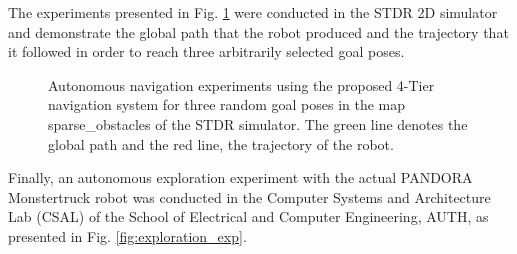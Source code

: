 \documentclass[conference]{IEEEtran}
\begin{document}
The experiments presented in Fig. \ref{fig:rsband_exp} were conducted in the STDR 2D simulator and demonstrate the global path that the robot produced and the trajectory that it followed in order to reach three arbitrarily selected goal poses.

\begin{figure}[!ht]
  \centering
  \caption{Autonomous navigation experiments using the proposed 4-Tier navigation system for three random goal poses in the map sparse\_obstacles of the STDR simulator. The green line denotes the global path and the red line, the trajectory of the robot.}
  \label{fig:rsband_exp}
\end{figure}

Finally, an autonomous exploration experiment with the actual PANDORA Monstertruck robot was conducted in the Computer Systems and Architecture Lab (CSAL) of the School of Electrical and Computer Engineering, AUTH, as presented in Fig. \ref{fig:exploration_exp}.
\end{document}
